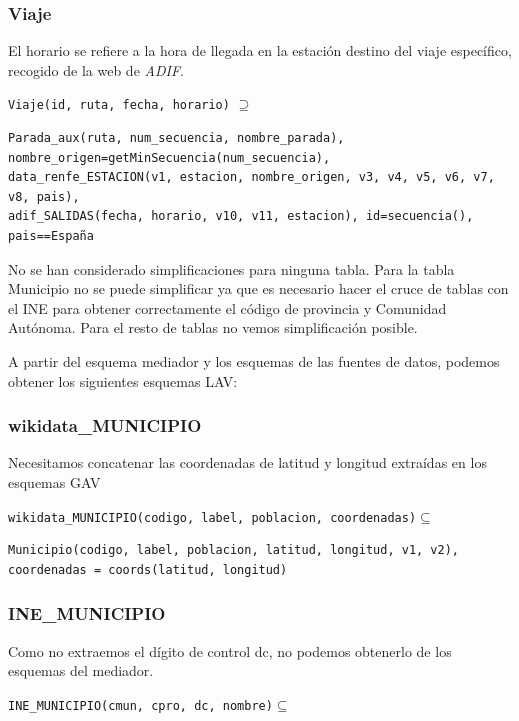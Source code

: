 \subsubsection{Viaje}\label{viaje}

El horario se refiere a la hora de llegada en la estación destino del
viaje específico, recogido de la web de \emph{ADIF}.

\texttt{Viaje(id,\ ruta,\ fecha,\ horario)} \(\supseteq\)

\begin{verbatim}
Parada_aux(ruta, num_secuencia, nombre_parada), nombre_origen=getMinSecuencia(num_secuencia), 
data_renfe_ESTACION(v1, estacion, nombre_origen, v3, v4, v5, v6, v7, v8, pais), 
adif_SALIDAS(fecha, horario, v10, v11, estacion), id=secuencia(), pais==España
\end{verbatim}

No se han considerado simplificaciones para ninguna tabla. Para la tabla
Municipio no se puede simplificar ya que es necesario hacer el cruce de
tablas con el INE para obtener correctamente el código de provincia y
Comunidad Autónoma. Para el resto de tablas no vemos simplificación
posible.

A partir del esquema mediador y los esquemas de las fuentes de datos,
podemos obtener los siguientes esquemas LAV:

\subsubsection{wikidata\_MUNICIPIO}\label{wikidata_municipio}

Necesitamos concatenar las coordenadas de latitud y longitud extraídas
en los esquemas GAV

\texttt{wikidata\_MUNICIPIO(codigo,\ label,\ poblacion,\ coordenadas)}\(\subseteq\)

\begin{verbatim}
Municipio(codigo, label, poblacion, latitud, longitud, v1, v2), 
coordenadas = coords(latitud, longitud)
\end{verbatim}

\subsubsection{INE\_MUNICIPIO}\label{ine_municipio}

Como no extraemos el dígito de control dc, no podemos obtenerlo de los
esquemas del mediador.

\texttt{INE\_MUNICIPIO(cmun,\ cpro,\ dc,\ nombre)}\(\subseteq\)

